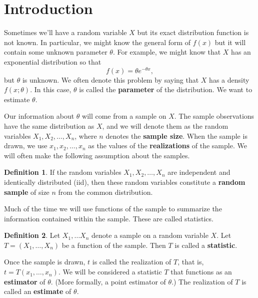 \documentclass[12pt]{article}
\theoremstyle{definition}
\newtheorem{definition}{Definition}
\begin{document}
\maketitle
\onehalfspace


\section{Introduction}

Sometimes we'll have a random variable $X$ but its exact distribution function is not known. In particular, we might know the general form of $f(x)$ but it will contain some unknown parameter $\theta$. For example, we might know that $X$ has an exponential distribution so that 
	\[	f(x) = \theta e^{-\theta x},\]
but $\theta$ is unknown. We often denote this problem by saying that $X$ has a density $f(x;\theta)$. In this case, $\theta$ is called the \textbf{parameter} of the distribution. We want to estimate $\theta$. 

Our information about $\theta$ will come from a sample on $X$. The sample observations have the same distribution as $X$, and we will denote them as the random variables $X_1, X_2, \hdots, X_n$, where $n$ denotes the \textbf{sample size}. When the sample is drawn, we use $x_1, x_2, \hdots, x_n$ as the values of the \textbf{realizations} of the sample. We will often make the following assumption about the samples.

\begin{definition}
	If the random variables $X_1, X_2, \hdots, X_n$ are independent and identically distributed (iid), then these random variables constitute a \textbf{random sample} of size $n$ from the common distribution.
\end{definition}

Much of the time we will use functions of the sample to summarize the information contained within the sample. These are called statistics. 

\begin{definition}
	Let $X_1, \hdots X_n$ denote a sample on a random variable $X$. Let $T=(X_1, \hdots, X_n)$ be a function of the sample. Then $T$ is called a \textbf{statistic}. 
\end{definition}

Once the sample is drawn, $t$ is called the realization of $T$, that is, $t = T(x_1, \hdots, x_n)$. We will be considered a statistic $T$ that functions as an \textbf{estimator} of $\theta$. (More formally, a point estimator of $\theta$.) The realization of $T$ is called an \textbf{estimate} of $\theta$.
\end{document}
